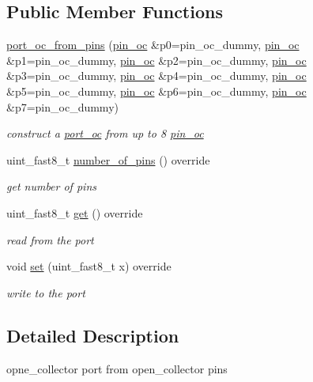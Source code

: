 \subsection*{Public Member Functions}
\begin{DoxyCompactItemize}
\item 
\hyperlink{classhwlib_1_1port__oc__from__pins_a39e109f1ef3098baa00de94c34d90703}{port\+\_\+oc\+\_\+from\+\_\+pins} (\hyperlink{classhwlib_1_1pin__oc}{pin\+\_\+oc} \&p0=pin\+\_\+oc\+\_\+dummy, \hyperlink{classhwlib_1_1pin__oc}{pin\+\_\+oc} \&p1=pin\+\_\+oc\+\_\+dummy, \hyperlink{classhwlib_1_1pin__oc}{pin\+\_\+oc} \&p2=pin\+\_\+oc\+\_\+dummy, \hyperlink{classhwlib_1_1pin__oc}{pin\+\_\+oc} \&p3=pin\+\_\+oc\+\_\+dummy, \hyperlink{classhwlib_1_1pin__oc}{pin\+\_\+oc} \&p4=pin\+\_\+oc\+\_\+dummy, \hyperlink{classhwlib_1_1pin__oc}{pin\+\_\+oc} \&p5=pin\+\_\+oc\+\_\+dummy, \hyperlink{classhwlib_1_1pin__oc}{pin\+\_\+oc} \&p6=pin\+\_\+oc\+\_\+dummy, \hyperlink{classhwlib_1_1pin__oc}{pin\+\_\+oc} \&p7=pin\+\_\+oc\+\_\+dummy)
\begin{DoxyCompactList}\small\item\em construct a \hyperlink{classhwlib_1_1port__oc}{port\+\_\+oc} from up to 8 \hyperlink{classhwlib_1_1pin__oc}{pin\+\_\+oc} \end{DoxyCompactList}\item 
uint\+\_\+fast8\+\_\+t \hyperlink{classhwlib_1_1port__oc__from__pins_af5b1708778a9fca66d0d46b5a56797ef}{number\+\_\+of\+\_\+pins} () override
\begin{DoxyCompactList}\small\item\em get number of pins \end{DoxyCompactList}\item 
uint\+\_\+fast8\+\_\+t \hyperlink{classhwlib_1_1port__oc__from__pins_a89a18f8d370a872e1018275177be7649}{get} () override
\begin{DoxyCompactList}\small\item\em read from the port \end{DoxyCompactList}\item 
void \hyperlink{classhwlib_1_1port__oc__from__pins_a8f1a2fecaf1f5d8433ea4fc8d07a5efb}{set} (uint\+\_\+fast8\+\_\+t x) override
\begin{DoxyCompactList}\small\item\em write to the port \end{DoxyCompactList}\end{DoxyCompactItemize}


\subsection{Detailed Description}
opne\+\_\+collector port from open\+\_\+collector pins 

